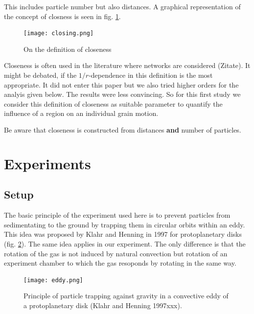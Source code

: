 This includes particle number but also distances.
A graphical representation of the concept of closness is seen in fig. \ref{fig.closing}.
\begin{figure}[h]
\texttt{[image: closing.png]}
    \caption{\label{fig.closing}On the definition of closeness}
\end{figure}

Closeness is often used in the literature where networks are considered (Zitate).
It might be debated, if the $1/r$-dependence in this definition is the most appropriate.
It did not enter this paper but we also tried higher orders for the analyis given below. The results were less convincing. So for this first study we
consider this definition of closeness as suitable parameter to quantify the influence of a region on an individual grain motion.



Be aware that closeness is constructed from distances \textbf{and} number
of particles.
 
\section{Experiments}
\subsection{Setup}

The basic principle of the experiment used here is to prevent particles from sedimentating to the ground by trapping them in circular orbits within an eddy. This idea was proposed by
Klahr and Henning in 1997 for protoplanetary disks (fig. \ref{fig.eddy}). The same idea applies in our experiment. The only difference is that the rotation of the gas is not
induced by natural convection but rotation of an experiment chamber to which the gas
resoponds by rotating in the same way.

 
\begin{figure}[h]
\texttt{[image: eddy.png]}
    \caption{\label{fig.eddy} Principle of particle trapping against gravity in a convective eddy of a protoplanetary disk (Klahr and Henning 1997xxx). }
\end{figure}

